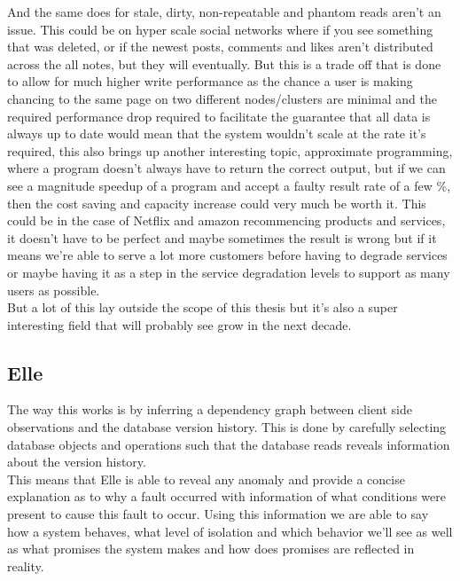 \documentclass[a4paper,10pt,titlepage]{report}
\begin{document}
    And the same does for stale, dirty, non-repeatable and phantom reads aren't an issue. This could be on hyper scale social networks where if you see something that was deleted, or if the newest posts, comments and likes aren't distributed across the all notes, but they will eventually. But this is a trade off that is done to allow for much higher write performance as the chance a user is making chancing to the same page on two different nodes/clusters are minimal and the required performance drop required to facilitate the guarantee that all data is always up to date would mean that the system wouldn't scale at the rate it's required, this also brings up another interesting topic, approximate programming, where a program doesn't always have to return the correct output, but if we can see a magnitude speedup of a program and accept a faulty result rate of a few \%, then the cost saving and capacity increase could very much be worth it. This could be in the case of Netflix and amazon recommencing products and services, it doesn't have to be perfect and maybe sometimes the result is wrong but if it means we're able to serve a lot more customers before having to degrade services or maybe having it as a step in the service degradation levels to support as many users as possible. \\
    \vspace{5mm}
    But a lot of this lay outside the scope of this thesis but it's also a super interesting field that will probably see grow in the next decade.


    \subsection{Elle}
    
    
    The way this works is by inferring a dependency graph between client side observations and the database version history. This is done by carefully selecting database objects and operations such that the database reads reveals information about the version history.\\
    \vspace{5mm}
    This means that Elle is able to reveal any anomaly and provide a concise explanation as to why a fault occurred with information of what conditions were present to cause this fault to occur. Using this information we are able to say how a system behaves, what level of isolation and which behavior we'll see as well as what promises the system makes and how does promises are reflected in reality.\\
    
\end{document}
